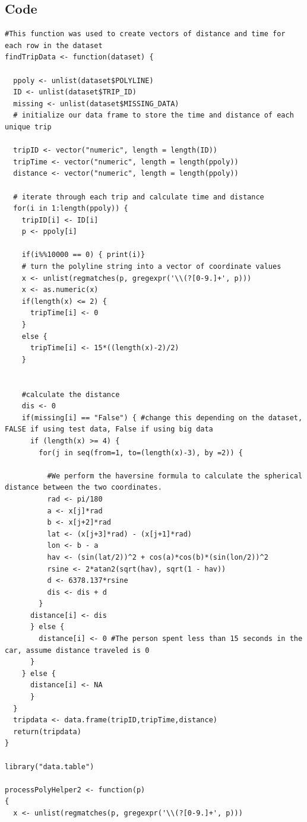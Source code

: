 \documentclass[letterpaper, 12 pt, conference]{article}
\begin{document}
\subsection{Code}
\begin{lstlisting}
#This function was used to create vectors of distance and time for each row in the dataset
findTripData <- function(dataset) {
  
  ppoly <- unlist(dataset$POLYLINE)
  ID <- unlist(dataset$TRIP_ID)
  missing <- unlist(dataset$MISSING_DATA)
  # initialize our data frame to store the time and distance of each unique trip
  
  tripID <- vector("numeric", length = length(ID))
  tripTime <- vector("numeric", length = length(ppoly))
  distance <- vector("numeric", length = length(ppoly))
  
  # iterate through each trip and calculate time and distance
  for(i in 1:length(ppoly)) {
    tripID[i] <- ID[i]
    p <- ppoly[i]
    
    if(i%%10000 == 0) { print(i)}
    # turn the polyline string into a vector of coordinate values
    x <- unlist(regmatches(p, gregexpr('\\(?[0-9.]+', p)))
    x <- as.numeric(x)
    if(length(x) <= 2) {
      tripTime[i] <- 0
    }
    else {
      tripTime[i] <- 15*((length(x)-2)/2)
    }
 
    
    #calculate the distance
    dis <- 0
    if(missing[i] == "False") { #change this depending on the dataset, FALSE if using test data, False if using big data
      if (length(x) >= 4) {
        for(j in seq(from=1, to=(length(x)-3), by =2)) {
          
          #We perform the haversine formula to calculate the spherical distance between the two coordinates.
          rad <- pi/180
          a <- x[j]*rad
          b <- x[j+2]*rad
          lat <- (x[j+3]*rad) - (x[j+1]*rad)
          lon <- b - a
          hav <- (sin(lat/2))^2 + cos(a)*cos(b)*(sin(lon/2))^2
          rsine <- 2*atan2(sqrt(hav), sqrt(1 - hav))
          d <- 6378.137*rsine
          dis <- dis + d
        }
      distance[i] <- dis
      } else {
        distance[i] <- 0 #The person spent less than 15 seconds in the car, assume distance traveled is 0
      }
    } else {
      distance[i] <- NA
      }
  }
  tripdata <- data.frame(tripID,tripTime,distance)
  return(tripdata)
}

library("data.table")

processPolyHelper2 <- function(p)
{ 
  x <- unlist(regmatches(p, gregexpr('\\(?[0-9.]+', p)))


\end{lstlisting}
\end{document}
